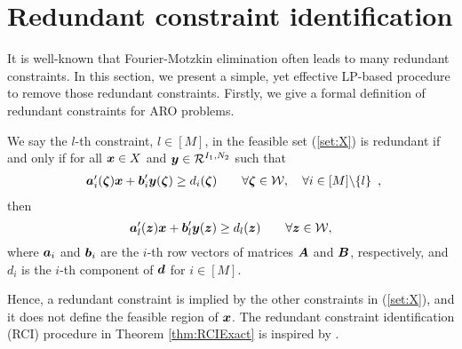 \documentclass[fleqn,isre,blindrev]{informs4}
\newcommand{\mb}[1]{\mbox{\boldmath \ensuremath{#1}}}
\begin{document}
	
	
	\section{Redundant constraint identification} \label{sec:RCI}
	
	It is well-known that Fourier-Motzkin elimination often leads to many redundant constraints. In this section, we present a simple, yet effective LP-based procedure to remove those redundant constraints. Firstly, we give a formal definition of redundant constraints for ARO problems. 
	\begin{definition} \label{def:RC1}
		We say the $l$-th constraint, $l\in [M]$, in the feasible set (\ref{set:X})  is redundant if and only if  for all $\mb{x} \in X$ and $\mb{y}\in \mathcal{R}^{I_1,N_2}$ such that
\begin{equation}\label{con:RCI}
				\begin{array}{rcll}
					\mb{a}'_i(\mb{\zeta})\mb{x}+\mb{b}'_i \mb{y}(\mb{\zeta}) \geq d_i(\mb{\zeta}) \qquad \forall \mb{\zeta} \in  \mathcal{W}, \quad \forall i  \in [M] \backslash \{l\} 
				\end{array},
\end{equation}
			then 
\begin{equation}  \label{con:RCI2}
				\mb{a}'_l(\mb{z})\mb{x}+\mb{b}'_l \mb{y}(\mb{z}) \geq d_l(\mb{z})  \qquad \forall \mb{z}  \in \mathcal{W},
\end{equation}
			where $\mb{a}_i$ and $\mb{b}_i$ are the $i$-th row vectors of matrices $\mb{A}$ and $\mb{B}$, respectively, and $d_i$ is the $i$-th component of $\mb{d}$ for $i\in [M]$.
		\end{definition}
		
		Hence, a redundant constraint is implied by the other constraints in (\ref{set:X}), and it does not define the feasible region of $\mb{x}$. The redundant constraint identification (RCI) procedure in Theorem \ref{thm:RCIExact} is inspired by \cite{cmp89}.
		
\end{document}
